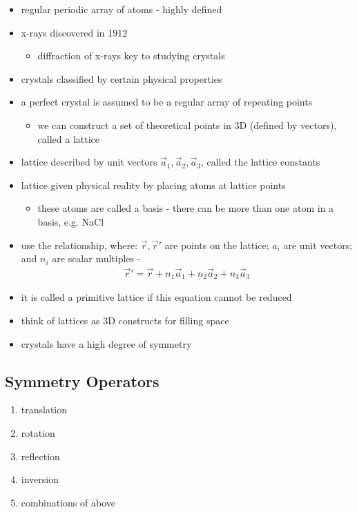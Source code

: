 \documentclass[a4paper,11pt,normalem]{article}
\begin{document}
\begin{itemize}
    \item regular periodic array of atoms - highly defined
    \item x-rays discovered in 1912
        \begin{itemize}
            \item diffraction of x-rays key to studying crystals
        \end{itemize}
    \item crystals classified by certain physical properties
    \item a perfect crystal is assumed to be a regular array of repeating points
        \begin{itemize}
            \item we can construct a set of theoretical points in 3D (defined by vectors), called a lattice
        \end{itemize}
    \item lattice described by unit vectors \(\vec{a}_1,\vec{a}_2,\vec{a}_3\), called the lattice constants
    \item lattice given physical reality by placing atoms at lattice points
        \begin{itemize}
            \item these atoms are called a basis - there can be more than one atom in a basis, e.g. NaCl
        \end{itemize}
    \item use the relationship, where: \(\vec{r},\vec{r}'\) are points on the lattice; \(a_i\) are unit vectors; and \(n_i\) are scalar multiples -
        \begin{align*}
            \vec{r}' = \vec{r} + n_1\vec{a}_1 + n_2\vec{a}_2 + n_3\vec{a}_3
        \end{align*}
    \item it is called a primitive lattice if this equation cannot be reduced
    \item think of lattices as 3D constructs for filling space
    \item crystals have a high degree of symmetry
\end{itemize}

\subsection{Symmetry Operators}

\begin{enumerate}
    \item translation
    \item rotation
    \item reflection
    \item inversion
    \item combinations of above
\end{enumerate}
\end{document}
